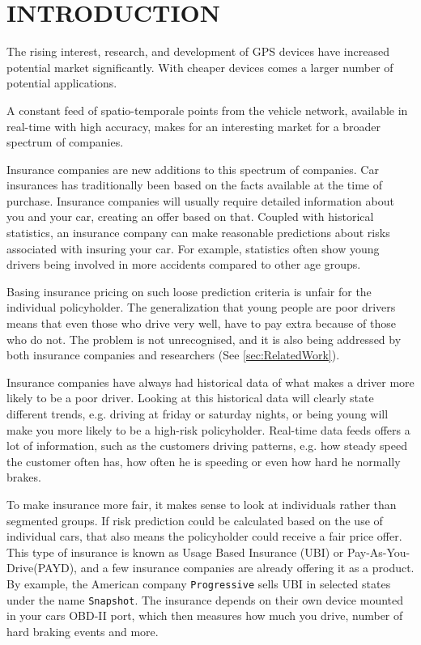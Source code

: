\section{INTRODUCTION}
\label{sec:intro}

The rising interest, research, and development of GPS devices have increased potential market significantly. With cheaper devices comes a larger number of potential applications. 

A constant feed of spatio-temporale points from the vehicle network, available in real-time with high accuracy, makes for an interesting market for a broader spectrum of companies.

Insurance companies are new additions to this spectrum of companies. Car insurances has traditionally been based on the facts available at the time of purchase. Insurance companies will usually require detailed information about you and your car, creating an offer based on that. Coupled with historical statistics, an insurance company can make reasonable predictions about risks associated with insuring your car. For example, statistics often show young drivers being involved in more accidents compared to other age groups\cite{accidents}.

Basing insurance pricing on such loose prediction criteria is unfair for the individual policyholder. The generalization that young people are poor drivers means that even those who drive very well, have to pay extra because of those who do not. The problem is not unrecognised, and it is also being addressed by both insurance companies and researchers (See \ref{sec:RelatedWork}).

Insurance companies have always had historical data of what makes a driver more likely to be a poor driver. Looking at this historical data will clearly state different trends\cite{url:forbes}, e.g. driving at friday or saturday nights, or being young will make you more likely to be a high-risk policyholder. Real-time data feeds offers a lot of information, such as the customers driving patterns, e.g. how steady speed the customer often has, how often he is speeding or even how hard he normally brakes.

To make insurance more fair, it makes sense to look at individuals rather than segmented groups. If risk prediction could be calculated based on the use of individual cars, that also means the policyholder could receive a fair price offer. This type of insurance is known as Usage Based Insurance (UBI) or Pay-As-You-Drive(PAYD), and a few insurance companies are already offering it as a product. By example, the American company \texttt{Progressive} sells UBI in selected states under the name \texttt{Snapshot}\cite{snapshot}. The insurance depends on their own device mounted in your cars OBD-II port, which then measures how much you drive, number of hard braking events and more.

